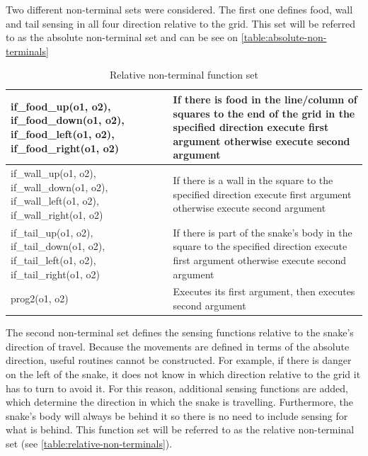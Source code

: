 \documentclass[12pt,a4paper]{article}
\begin{document}
	Two different non-terminal sets were considered. The first one defines food, wall and tail sensing in all four direction relative to the grid. This set will be referred to as the absolute non-terminal set and can be see on \autoref{table:absolute-non-terminals}
	
	\begin{table}[h!]
		\centering
		\begin{tabu} to \textwidth {|X[3,l]|X[5,l]|}
			\hline
			if\_food\_up(o1, o2), if\_food\_down(o1, o2), if\_food\_left(o1, o2), if\_food\_right(o1, o2) & If there is food in the line/column of squares to the end of the grid in the specified direction execute first argument otherwise execute second argument\\  
			\hline
			
			if\_wall\_up(o1, o2), if\_wall\_down(o1, o2), if\_wall\_left(o1, o2), if\_wall\_right(o1, o2) & If there is a wall in the square to the specified direction execute first argument otherwise execute second argument\\  
			\hline
			
			if\_tail\_up(o1, o2), if\_tail\_down(o1, o2), if\_tail\_left(o1, o2), if\_tail\_right(o1, o2) & If there is part of the snake's body in the square to the specified direction execute first argument otherwise execute second argument\\  
			\hline
			
			prog2(o1, o2) & Executes its first argument, then executes second argument \\   
			\hline
		\end{tabu}
		
		\caption{Relative non-terminal function set}
		\label{table:relative-non-terminals}
	\end{table}
	
	The second non-terminal set defines the sensing functions relative to the snake's direction of travel. Because the movements are defined in terms of the absolute direction, useful routines cannot be constructed. For example, if there is danger on the left of the snake, it does not know in which direction relative to the grid it has to turn to avoid it. For this reason, additional sensing functions are added, which determine the direction in which the snake is travelling. Furthermore, the snake's body will always be behind it so there is no need to include sensing for what is behind. This function set will be referred to as the relative non-terminal set (see \autoref{table:relative-non-terminals}).
	
\end{document}
